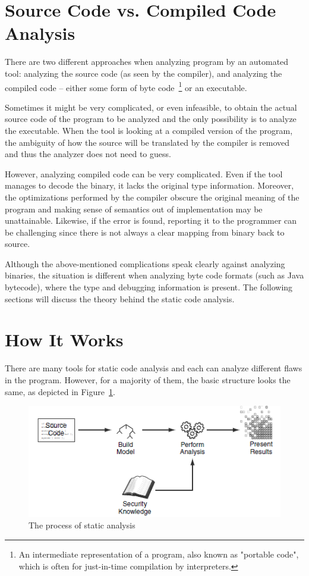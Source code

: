\documentclass[
  digital, %
  table,   %
  lof,     %
  lot,     %
  oneside,
]{fithesis3}
\begin{document}
\section{Source Code vs. Compiled Code Analysis}
There are two different approaches when analyzing program by an automated tool: analyzing the source code (as seen by the compiler), and analyzing the compiled code -- either some form of byte code~\footnote{An intermediate representation of a program, also known as "portable code", which is often for just-in-time compilation by interpreters.} or an executable.

Sometimes it might be very complicated, or even infeasible, to obtain the actual source code of the program to be analyzed and the only possibility is to analyze the executable. When the tool is looking at a compiled version of the program, the ambiguity of how the source will be translated by the compiler is removed and thus the analyzer does not need to guess. 

However, analyzing compiled code can be very complicated. Even if the tool manages to decode the binary, it lacks the original type information. Moreover, the optimizations performed by the compiler obscure the original meaning of the program and making sense of semantics out of implementation may be unattainable. Likewise, if the error is found, reporting it to the programmer can be challenging since there is not always a clear mapping from binary back to source. 

Although the above-mentioned complications speak clearly against analyzing binaries, the situation is different when analyzing byte code formats (such as Java bytecode), where the type and debugging information is present. The following sections will discuss the theory behind the static code analysis.

\section{How It Works}
There are many tools for static code analysis and each can analyze different flaws in the program. However, for a majority of them, the basic structure looks the same, as depicted in Figure~\ref{fig:static-code-analysis-internals}.

\begin{figure}[h!]
		\centering
			\includegraphics[scale=0.75]{img/static-code-analysis-internals}
		\caption{The process of static analysis~\cite{secure-programming-sca}}
		\label{fig:static-code-analysis-internals}
\end{figure}
\end{document}

